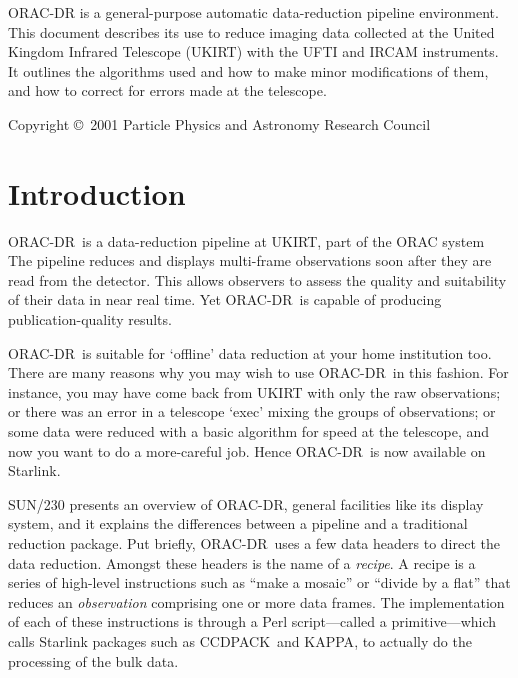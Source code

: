 \documentclass[twoside,11pt]{article}
\newcommand{\stardocinitials}  {SUN}
\newcommand{\stardocnumber}    {232.4}
\newcommand{\stardoccopyright} {Copyright \copyright\ 2001 Particle Physics and Astronomy Research Council}
\newcommand{\stardocabstract}  {{\footnotesize ORAC-DR} is a
general-purpose automatic data-reduction pipeline environment.  This
document describes its use to reduce imaging data collected at the
United Kingdom Infrared Telescope (UKIRT) with the UFTI and IRCAM
instruments.  It outlines the algorithms used and how to make minor
modifications of them, and how to correct for errors made at the
telescope.}
\newcommand{\stardocname}{\stardocinitials /\stardocnumber}
\newcommand{\htmladdnormallink}[2]{#1}
\newenvironment{latexonly}{}{}
\newcommand{\xref}[3]{#1}
\newcommand{\xlabel}[1]{}
\renewcommand{\_}{\texttt{\symbol{95}}}
\newcommand{\CCDPACK}{{\footnotesize CCDPACK}}
\newcommand{\KAPPA}{{\footnotesize KAPPA}}
\newcommand{\ORACDR}{{\footnotesize ORAC-DR}}
\renewcommand{\thepage}{\roman{page}}
\begin{document}
\stardocabstract

\begin{latexonly}
\newpage
\vspace*{\fill}
\stardoccopyright
\end{latexonly}

  \newpage
  \begin{latexonly}
    \setlength{\parskip}{0mm}
    \tableofcontents
    \setlength{\parskip}{\medskipamount}
    \markboth{\stardocname}{\stardocname}
  \end{latexonly}
\cleardoublepage
\renewcommand{\thepage}{\arabic{page}}
\setcounter{page}{1}

\section{\xlabel{introduction}Introduction\label{introduction}}

\ORACDR\ is a data-reduction pipeline at UKIRT, part of the
\htmladdnormallink{ORAC system}{http://www.stsci.edu/stsci/meetings/adassVII/bridgera.html}
The pipeline reduces and displays multi-frame
observations soon after they are read from the detector.  This allows
observers to assess the quality and suitability of their data in near
real time.  Yet \ORACDR\ is capable of producing publication-quality
results.  

\ORACDR\ is suitable for `offline' data reduction at your home
institution too.  There are many reasons why you may wish to use
\ORACDR\ in this fashion.  For instance, you may have come back from
UKIRT with only the raw observations; or there was an error in a
telescope `exec' mixing the groups of observations; or some data were
reduced with a basic algorithm for speed at the telescope, and now you
want to do a more-careful job.  Hence \ORACDR\ is now available on
Starlink.

\xref{SUN/230}{sun230}{} presents an overview of \ORACDR,
general facilities like its display system, and it explains the
differences between a pipeline and a traditional reduction package.
Put briefly, \ORACDR\ uses a few data headers to direct the data
reduction.  Amongst these headers is the name of a {\em recipe}.  A
recipe is a series of high-level instructions such as ``make a
mosaic'' or ``divide by a flat'' that reduces an {\em observation\/}
comprising one or more data frames.  The implementation of each of
these instructions is through a Perl script---called a
primitive---which calls Starlink packages such as \CCDPACK\ and \KAPPA,
to actually do the processing of the bulk data.
\end{document}
